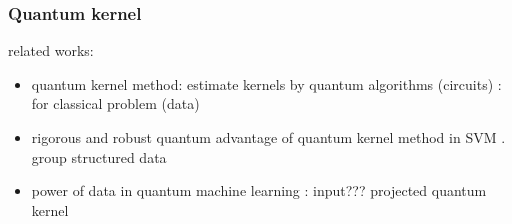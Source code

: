 \subsubsection{Quantum kernel}
related works:
\begin{itemize}
	\item quantum kernel method: estimate kernels by quantum algorithms (circuits)	\cite{havlicekSupervisedLearningQuantum2019}
	\cite{schuldQuantumMachineLearning2019}: for classical problem (data)

	\item rigorous and robust quantum advantage of quantum kernel method in SVM \cite{liuRigorousRobustQuantum2021}. group structured data \cite{glickCovariantQuantumKernels2021}

	\item power of data in quantum machine learning \cite{huangPowerDataQuantum2021}: input??? projected quantum kernel
\end{itemize}

